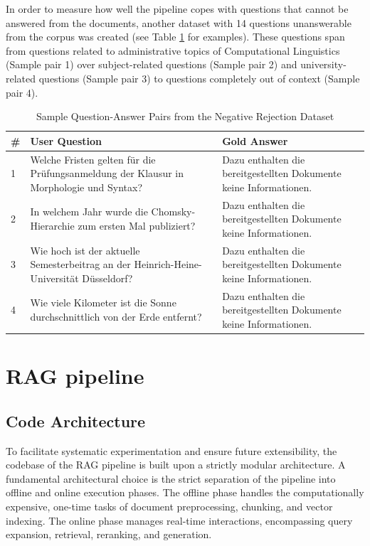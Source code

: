 \documentclass[12pt]{article} %
\begin{document}
In order to measure how well the pipeline copes with questions that cannot be answered from the documents, another dataset with 14 questions unanswerable from the corpus was created (see Table \ref{tab:negative_rejection_samples} for examples). These questions span from questions related to administrative topics of Computational Linguistics (Sample pair 1) over subject-related questions (Sample pair 2) and university-related questions (Sample pair 3) to questions completely out of context (Sample pair 4).
\begin{table}[htbp]
    \centering
    \small
    \caption{Sample Question-Answer Pairs from the Negative Rejection Dataset}
    \label{tab:negative_rejection_samples}
    \renewcommand{\arraystretch}{1.3}
    \begin{tabular}{p{} p{} p{}}
        \toprule
        \textbf{\#} & \textbf{User Question}                                                                  & \textbf{Gold Answer}                                               \\
        \midrule
        1           & Welche Fristen gelten für die Prüfungsanmeldung der Klausur in Morphologie und Syntax?  & Dazu enthalten die bereitgestellten Dokumente keine Informationen. \\
        \midrule
        2           & In welchem Jahr wurde die Chomsky-Hierarchie zum ersten Mal publiziert?                 & Dazu enthalten die bereitgestellten Dokumente keine Informationen. \\
        \midrule
        3           & Wie hoch ist der aktuelle Semesterbeitrag an der Heinrich-Heine-Universität Düsseldorf? & Dazu enthalten die bereitgestellten Dokumente keine Informationen. \\
        \midrule
        4           & Wie viele Kilometer ist die Sonne durchschnittlich von der Erde entfernt?               & Dazu enthalten die bereitgestellten Dokumente keine Informationen. \\
        \bottomrule
    \end{tabular}
\end{table}



\section{RAG pipeline}
\subsection{Code Architecture}
To facilitate systematic experimentation and ensure future extensibility, the codebase of the RAG pipeline is built upon a strictly modular architecture. A fundamental architectural choice is the strict separation of the pipeline into offline and online execution phases. The offline phase handles the computationally expensive, one-time tasks of document preprocessing, chunking, and vector indexing. The online phase manages real-time interactions, encompassing query expansion, retrieval, reranking, and generation.
\end{document}
